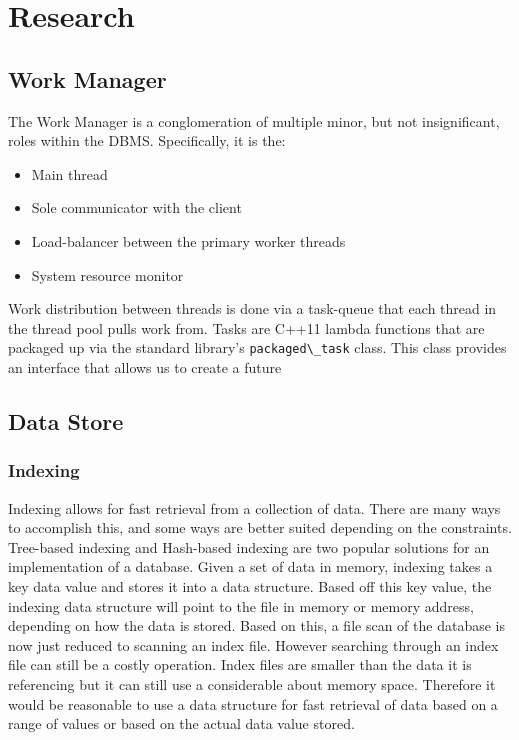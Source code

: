 \documentclass[letterpaper]{article}
\begin{document}
\section{Research}
\subsection{Work Manager}
The Work Manager is a conglomeration of multiple minor, but not insignificant, roles
within the DBMS. Specifically, it is the:
\begin{itemize}
  \item Main thread
  \item Sole communicator with the client
  \item Load-balancer between the primary worker threads
  \item System resource monitor
\end{itemize}

Work distribution between threads is done via a task-queue that each thread in the
thread pool pulls work from. Tasks are C++11 lambda functions that are packaged up 
via the standard library's \lstinline|packaged\_task| class. This class provides an interface that
allows us to create a future

\subsection{Data Store}
\subsubsection{Indexing}
Indexing allows for fast retrieval from a collection of data. There are many ways to accomplish this, and some ways are better suited depending on the constraints. Tree-based indexing and Hash-based indexing are two popular solutions for an implementation of a database. Given a set of data in memory, indexing takes a key data value and stores it into a data structure. Based off this key value, the indexing data structure will point to the file in memory or memory address, depending on how the data is stored. Based on this, a file scan of the database is now just reduced to scanning an index file. 
However searching through an index file can still be a costly operation. Index files are smaller than the data it is referencing but it can still use a considerable about memory space. Therefore it would be reasonable to use a data structure for fast retrieval of data based on a range of values or based on the actual data value stored.
\end{document}
